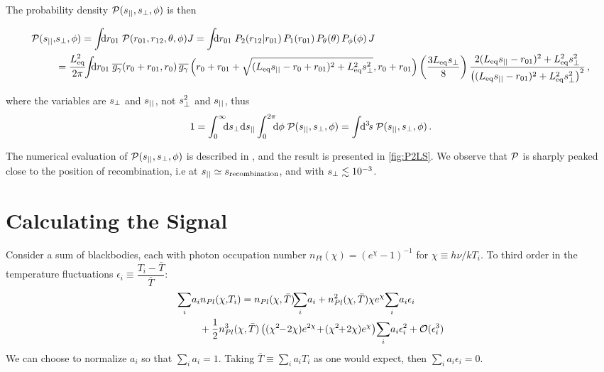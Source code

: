 \documentclass[fleqn,usenatbib]{mnras}
\begin{document}
    The probability density $\mathcal{P}(s_{||},s_{\perp},\phi)$ is then

    \begin{widetext}
    \begin{align} \label{eq:Pspllsprpphi}
        \mcal{P}(\spll,&\sprp,\phi)
            = \int\!\!\!\dif{r_{01}} \; \mcal{P}(r_{01},r_{12},\theta,\phi) J
             = \int\!\!\!\dif{r_{01}} \; P_2(r_{12}|r_{01}) \, P_1(r_{01}) \, P_\theta(\theta) \, P_\phi(\phi) \, J
            \\
            &= \frac{\Leq^2}{2\pi} \!\!
               \int\!\!\!\dif{r_{01}} \;
                \GgamBar(r_0+r_{01},r_0) \,
                \GgamBar\left( r_0+r_{01}+\sqrt{(\Leq \spll-r_0+r_{01})^2+\Leq^2\sprp^2}, r_0+r_{01} \right)
                \left( \frac{3\Leq \sprp}{8} \right)
                \frac{2(\Leq \spll-r_{01})^2 + \Leq^2\sprp^2}
                    {\left((\Leq \spll-r_{01})^2+\Leq^2\sprp^2\right)^2} \,, \nonumber
    \end{align}
    \end{widetext}
    where the variables are $s_{\perp}$ and $s_{||}$, not $s_{\perp}^2$ and
    $s_{||}$, thus
    \begin{equation} \label{eq:Pnormalization}
        1 = \int_0^{\infty}\!\!\!\dif{\sprp} \dif{\spll} \int_0^{2\pi}\!\!\!\dif{\phi} \; \mcal{P}(\spll,\sprp,\phi)
          = \int\!\!\dif[3]{s}\; \mcal{P}(\spll,\sprp,\phi) \,. \nonumber
    \end{equation}

    The numerical evaluation of $\mathcal{P}(s_{||},s_{\perp},\phi)$ is described in
    , and the result is presented in \autoref{fig:P2LS}.
    We observe that $\mathcal{P}$ is sharply peaked close to the position of
    recombination, i.e at $s_{||} \simeq s_{\rm recombination}$, and with $s_{\perp} \lesssim
    10^{-3}$.



\section{Calculating the Signal} \label{sec:calculating_the_signal}

    Consider a sum of blackbodies, each with photon occupation number
    $n_{Pl}(\chi)=(e^\chi-1)^{-1}$ for $\chi\equiv h\nu/kT_i$.  To third order
    in the temperature fluctuations $\epsilon_i \equiv
    \dfrac{T_i-\bar{T}}{\bar{T}}$:
    \begin{align} \label{eqn:sumofbb}
        \sum_i & a_i n_{Pl}(\chi,\!T_i)
            =   n_{Pl}(\chi,\bar{T}) \!\! \sum_i\!a_i
              + n_{Pl}^2(\chi,\bar{T}) \chi e^\chi \! \sum_i \! a_i \epsilon_i
            \\ & \phantom{=}
              + \frac{1}{2} n_{Pl}^3(\chi,\bar{T}) \left((\chi^2\!\!-\!2\chi) \Exp{2\chi} \!+\! (\chi^2 \!\!+\! 2\chi)e^\chi\right) \!\sum_i\!a_i\epsilon_i^2
              + \mcal{O}(\epsilon_i^3)  \nonumber
    \end{align}
    We can choose to normalize $a_i$ so that $\sum_i a_i=1$.  Taking
    $\bar{T}\equiv\sum_i a_i T_i$ as one would expect, then $\sum_i
    a_i\epsilon_i=0$.
\end{document}
